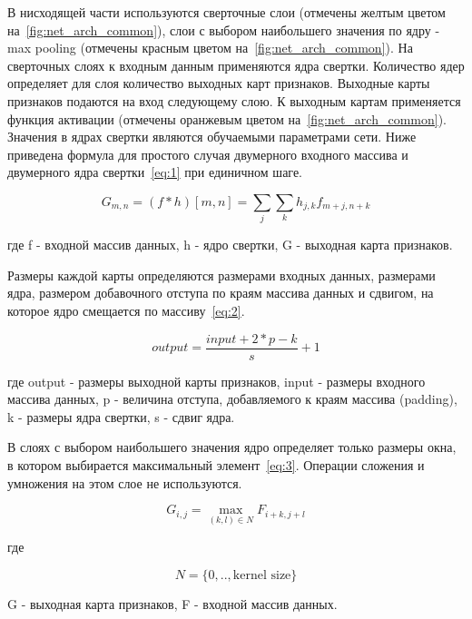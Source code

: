 В нисходящей части используются сверточные слои (отмечены желтым цветом на~\ref{fig:net_arch_common}),
слои с выбором наибольшего значения по ядру - max pooling (отмечены красным цветом на~\ref{fig:net_arch_common}).
На сверточных слоях к входным данным применяются ядра свертки.
Количество ядер определяет для слоя количество выходных карт признаков.
Выходные карты признаков подаются на вход следующему слою.
К выходным картам применяется функция активации (отмечены оранжевым цветом на~\ref{fig:net_arch_common}).
Значения в ядрах свертки являются обучаемыми параметрами сети.
Ниже приведена формула для простого случая двумерного входного массива и двумерного ядра свертки~\eqref{eq:1} при единичном шаге.

\begin{equation}
    \label{eq:1}
    G_{m, n} = (f*h)[m, n] = \sum_{j}{\sum_{k}{h_{j, k} f_{m + j, n + k}}}
\end{equation}

где f - входной массив данных, h - ядро свертки, G - выходная карта признаков.

Размеры каждой карты определяются размерами входных данных, размерами ядра, размером добавочного отступа по краям массива данных и сдвигом,
на которое ядро смещается по массиву~\eqref{eq:2}.

\begin{equation}
    \label{eq:2}
    output = \frac{input + 2 * p - k}{s} + 1
\end{equation}

где output - размеры выходной карты признаков, input - размеры входного массива данных, p - величина отступа, добавляемого к краям массива (padding),
k - размеры ядра свертки, s - сдвиг ядра.

В слоях с выбором наибольшего значения ядро определяет только размеры окна, в котором выбирается максимальный элемент~\eqref{eq:3}.
Операции сложения и умножения на этом слое не используются.

\begin{equation}
    \label{eq:3}
    G_{i, j} = \max_{(k, l) \in N}{F_{i + k, j + l}}
\end{equation}

где

\begin{equation}
    \label{eq:4}
    N = \{0, .. , \text{kernel size}\}
\end{equation}

G - выходная карта признаков, F - входной массив данных.

